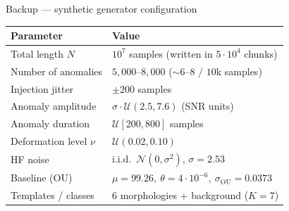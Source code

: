 \documentclass[11pt, aspectratio=169]{beamer}
\begin{document}
\begin{frame}{Backup --- synthetic generator configuration}
  \begin{table}
    \centering\footnotesize
    \begin{tabular}{ll}
      \toprule
      Parameter & Value \\
      \midrule
      Total length $N$        & $10^{7}$ samples (written in $5\cdot10^{4}$ chunks) \\
      Number of anomalies     & $5{,}000$--$8{,}000$ ($\sim 6$--$8$ / $10$k samples) \\
      Injection jitter        & $\pm 200$ samples \\
      Anomaly amplitude       & $\sigma\cdot\mathcal{U}(2.5,7.6)$ (SNR units) \\
      Anomaly duration        & $\mathcal{U}[200,800]$ samples \\
      Deformation level $\nu$ & $\mathcal{U}(0.02,0.10)$ \\
      HF noise                & i.i.d.\ $\mathcal{N}(0,\sigma^2)$, $\sigma=2.53$ \\
      Baseline (OU)           & $\mu=99.26,\ \theta=4\cdot10^{-6},\ \sigma_{\mathrm{OU}}=0.0373$ \\
      Templates / classes     & 6 morphologies $+$ background ($K=7$) \\
      \bottomrule
    \end{tabular}
  \end{table}
\end{frame}
\end{document}
